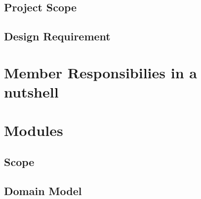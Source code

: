 \documentclass[12pt]{article}
\begin{document}
\paragraph{}

\subsection{Project Scope}
\paragraph{}

\subsection{Design Requirement}
\paragraph{}

\section{Member Responsibilies in a nutshell}
\paragraph{}

\section{Modules}
\paragraph{}

\subsection{Scope}
\paragraph{}

\subsection{Domain Model}
\paragraph{}
\end{document}
